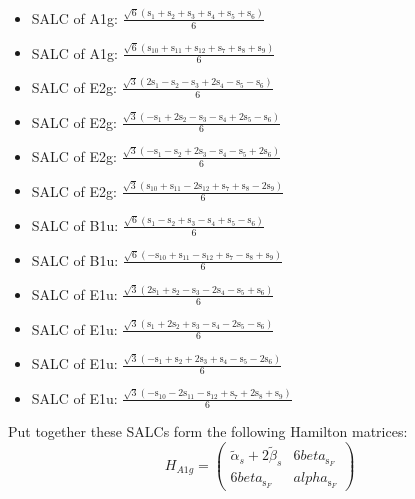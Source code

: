 \documentclass[12pt,a4paper]{article}
\begin{document}
\begin{itemize}
\item SALC of A1g: \quad $\frac{\sqrt{6} \left(\text{s}_{1} + \text{s}_{2} + \text{s}_{3} + \text{s}_{4} + \text{s}_{5} + \text{s}_{6}\right)}{6}$
\item SALC of A1g: \quad $\frac{\sqrt{6} \left(\text{s}_{10} + \text{s}_{11} + \text{s}_{12} + \text{s}_{7} + \text{s}_{8} + \text{s}_{9}\right)}{6}$
\item SALC of E2g: \quad $\frac{\sqrt{3} \left(2 \text{s}_{1} - \text{s}_{2} - \text{s}_{3} + 2 \text{s}_{4} - \text{s}_{5} - \text{s}_{6}\right)}{6}$
\item SALC of E2g: \quad $\frac{\sqrt{3} \left(- \text{s}_{1} + 2 \text{s}_{2} - \text{s}_{3} - \text{s}_{4} + 2 \text{s}_{5} - \text{s}_{6}\right)}{6}$
\item SALC of E2g: \quad $\frac{\sqrt{3} \left(- \text{s}_{1} - \text{s}_{2} + 2 \text{s}_{3} - \text{s}_{4} - \text{s}_{5} + 2 \text{s}_{6}\right)}{6}$
\item SALC of E2g: \quad $\frac{\sqrt{3} \left(\text{s}_{10} + \text{s}_{11} - 2 \text{s}_{12} + \text{s}_{7} + \text{s}_{8} - 2 \text{s}_{9}\right)}{6}$
\item SALC of B1u: \quad $\frac{\sqrt{6} \left(\text{s}_{1} - \text{s}_{2} + \text{s}_{3} - \text{s}_{4} + \text{s}_{5} - \text{s}_{6}\right)}{6}$
\item SALC of B1u: \quad $\frac{\sqrt{6} \left(- \text{s}_{10} + \text{s}_{11} - \text{s}_{12} + \text{s}_{7} - \text{s}_{8} + \text{s}_{9}\right)}{6}$
\item SALC of E1u: \quad $\frac{\sqrt{3} \left(2 \text{s}_{1} + \text{s}_{2} - \text{s}_{3} - 2 \text{s}_{4} - \text{s}_{5} + \text{s}_{6}\right)}{6}$
\item SALC of E1u: \quad $\frac{\sqrt{3} \left(\text{s}_{1} + 2 \text{s}_{2} + \text{s}_{3} - \text{s}_{4} - 2 \text{s}_{5} - \text{s}_{6}\right)}{6}$
\item SALC of E1u: \quad $\frac{\sqrt{3} \left(- \text{s}_{1} + \text{s}_{2} + 2 \text{s}_{3} + \text{s}_{4} - \text{s}_{5} - 2 \text{s}_{6}\right)}{6}$
\item SALC of E1u: \quad $\frac{\sqrt{3} \left(- \text{s}_{10} - 2 \text{s}_{11} - \text{s}_{12} + \text{s}_{7} + 2 \text{s}_{8} + \text{s}_{9}\right)}{6}$
\end{itemize}
Put together these SALCs form the following Hamilton matrices:
     $$ H_{A1g}= \begin{pmatrix}\tilde{\alpha}_{s} + 2 \tilde{\beta}_{s} & 6 beta_{\text{s}_F}\\6 beta_{\text{s}_F} & alpha_{\text{s}_F}\end{pmatrix}$$ 
\end{document}
